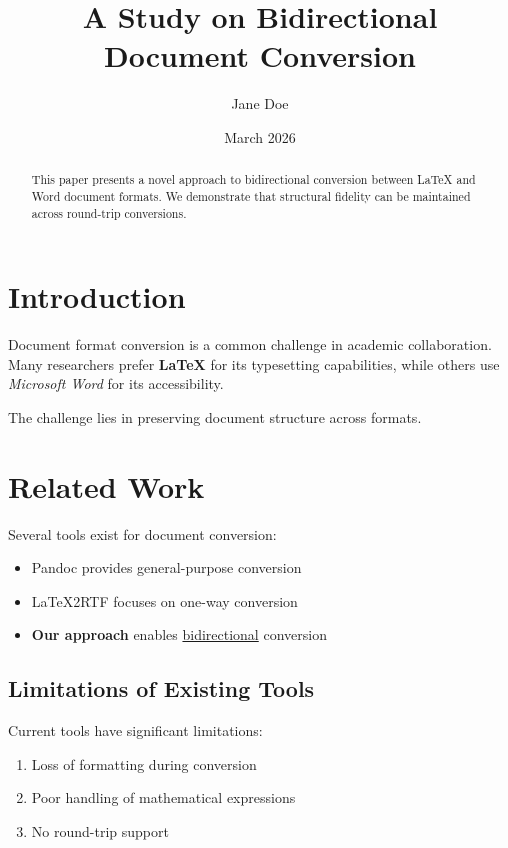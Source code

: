 \documentclass[12pt,a4paper]{article}
\title{A Study on Bidirectional Document Conversion}
\author{Jane Doe}
\date{March 2026}
\begin{document}
\maketitle

\begin{abstract}
This paper presents a novel approach to bidirectional conversion between
LaTeX and Word document formats. We demonstrate that structural fidelity
can be maintained across round-trip conversions.
\end{abstract}

\section{Introduction}

Document format conversion is a common challenge in academic
collaboration. Many researchers prefer \textbf{LaTeX} for its
typesetting capabilities, while others use \textit{Microsoft Word}
for its accessibility.

The challenge lies in preserving document structure across formats.

\section{Related Work}

Several tools exist for document conversion:

\begin{itemize}
  \item Pandoc provides general-purpose conversion
  \item LaTeX2RTF focuses on one-way conversion
  \item \textbf{Our approach} enables \underline{bidirectional} conversion
\end{itemize}

\subsection{Limitations of Existing Tools}

Current tools have significant limitations:

\begin{enumerate}
  \item Loss of formatting during conversion
  \item Poor handling of mathematical expressions
  \item No round-trip support
\end{enumerate}
\end{document}
